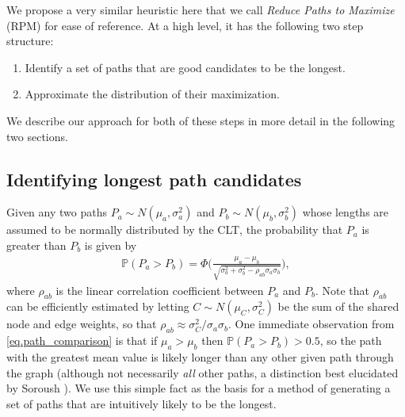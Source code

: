 \documentclass[12pt]{article}
\def\P{\mathbb{P}}
\begin{document}
We propose a very similar heuristic here that we call {\em Reduce Paths to Maximize} (RPM) for ease of reference. At a high level, it has the following two step structure:
\begin{enumerate}
\item Identify a set of paths that are good candidates to be the longest.
  \item Approximate the distribution of their maximization.
  \end{enumerate}
We describe our approach for both of these steps in more detail in the following two sections.

\subsection{Identifying longest path candidates}
\label{subsect.identifying}

Given any two paths $P_a \sim N(\mu_a, \sigma_a^2)$ and $P_b \sim N(\mu_b, \sigma_b^2)$ whose lengths are assumed to be normally distributed by the CLT, the probability that $P_a$ is greater than $P_b$ is given by
\begin{align}
  \label{eq.path_comparison}
  \P(P_a > P_b) = \Phi \bigg( \frac{\mu_a - \mu_b}{\sqrt{\sigma_a^2 + \sigma_b^2 - \rho_{ab}\sigma_a \sigma_b}} \bigg),
\end{align}
where $\rho_{ab}$ is the linear correlation coefficient between $P_a$ and $P_b$. Note that $\rho_{ab}$ can be efficiently estimated by letting $C \sim N(\mu_C, \sigma_C^2)$ be the sum of the shared node and edge weights, so that $\rho_{ab} \approx \sigma_C^2 / \sigma_a \sigma_b$. 
One immediate observation from \eqref{eq.path_comparison} is that if $\mu_a > \mu_b$ then $\P(P_a > P_b) > 0.5$, so the path with the greatest mean value is likely longer than any other given path through the graph (although not necessarily {\em all} other paths, a distinction best elucidated by Soroush \cite{sor94}). We use this simple fact as the basis for a method of generating a set of paths that are intuitively likely to be the longest.
\end{document}
